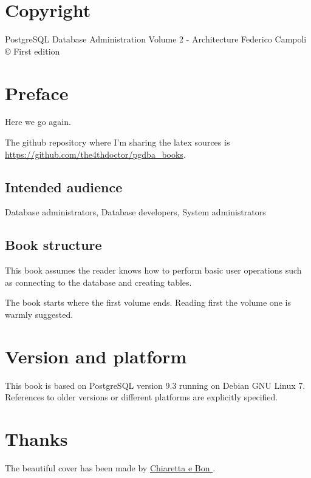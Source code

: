 \documentclass[oneside]{book}
\begin{document}
\chapter*{Copyright}
PostgreSQL Database Administration Volume 2 - Architecture\newline
Federico Campoli \copyright {} \newline
First edition\newline



 



\chapter*{Preface}
Here we go again.


The github repository where I'm sharing the latex sources  is 
\href{https://github.com/the4thdoctor/pgdba\_books}{
https://github.com/the4thdoctor/pgdba\_books}.\newline


\section*{Intended audience}
Database administrators,  Database developers, System administrators

\section*{Book structure}
This book assumes the reader knows how to perform basic user operations such as
connecting to the database and creating tables.\newline

The book starts where the first volume ends. Reading first the volume one is warmly suggested.\newline


\chapter*{Version and platform}
This book is based on PostgreSQL version 9.3 running on Debian GNU Linux 7.
References to older versions or different platforms are explicitly specified.

\chapter*{Thanks}
The beautiful cover has been made by \href{http://www.bonland.eu/}{Chiaretta e Bon }.\newline
\end{document}
